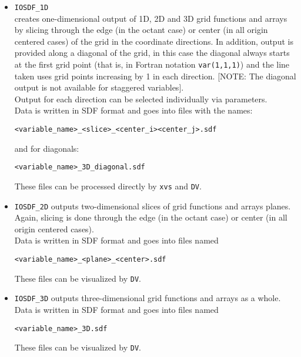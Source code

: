 \documentclass{article}
\begin{document}
\begin{itemize}
  \item {\tt IOSDF\_1D}\\
    creates one-dimensional output of 1D, 2D and
    3D grid functions and arrays by slicing through the edge (in the
    octant case) or center (in all origin centered cases) of the grid in
    the coordinate directions.  In addition, output is provided
    along a diagonal of the grid, in this case the diagonal always starts
    at the first grid point (that is, in Fortran notation {\tt var(1,1,1)})
    and the line taken uses grid points increasing by 1 in each direction.
    [NOTE: The diagonal output is not available for staggered variables].\\
    Output for each direction can be selected individually via parameters.\\
    Data is written in SDF format and goes into files with the names:
   \begin{center}
    {\tt <variable\_name>\_<slice>\_<center\_i><center\_j>.sdf}
   \end{center}
    and for diagonals:
    \begin{center}{\tt <variable\_name>\_3D\_diagonal.sdf}
    \end{center}
    These files can be processed directly by {\tt xvs} and {\tt DV}.

  \item {\tt IOSDF\_2D}
    outputs two-dimensional slices of grid functions and arrays planes.
    Again, slicing is done through the edge (in the octant case) or center
    (in all origin centered cases).\\
    Data is written in SDF format and goes into files named
\begin{center}
    {\tt <variable\_name>\_<plane>\_<center>.sdf}
\end{center}
    These files can be visualized by {\tt DV}.

  \item {\tt IOSDF\_3D}
    outputs three-dimensional grid functions and arrays as a whole.\\
    Data is written in SDF format and goes into files named
\begin{center}
    {\tt <variable\_name>\_3D.sdf}
\end{center}
    These files can be visualized by {\tt DV}.
\end{itemize}
%
%
\end{document}
